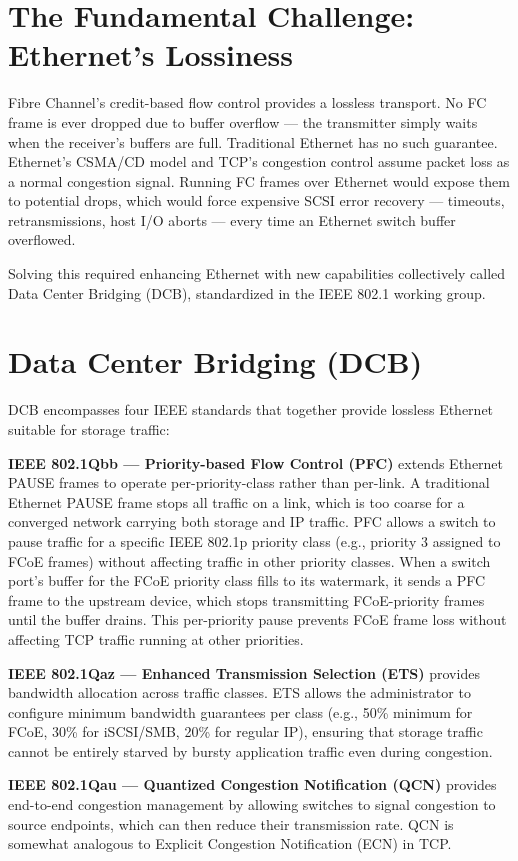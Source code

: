 \section{The Fundamental Challenge: Ethernet's Lossiness}
Fibre Channel's credit-based flow control provides a lossless transport. No FC frame is ever dropped due to buffer overflow --- the transmitter simply waits when the receiver's buffers are full. Traditional Ethernet has no such guarantee. Ethernet's CSMA/CD model and TCP's congestion control assume packet loss as a normal congestion signal. Running FC frames over Ethernet would expose them to potential drops, which would force expensive SCSI error recovery --- timeouts, retransmissions, host I/O aborts --- every time an Ethernet switch buffer overflowed.

Solving this required enhancing Ethernet with new capabilities collectively called Data Center Bridging (DCB), standardized in the IEEE 802.1 working group.

\section{Data Center Bridging (DCB)}
DCB encompasses four IEEE standards that together provide lossless Ethernet suitable for storage traffic:

\textbf{IEEE 802.1Qbb --- Priority-based Flow Control (PFC)} extends Ethernet PAUSE frames to operate per-priority-class rather than per-link. A traditional Ethernet PAUSE frame stops all traffic on a link, which is too coarse for a converged network carrying both storage and IP traffic. PFC allows a switch to pause traffic for a specific IEEE 802.1p priority class (e.g., priority 3 assigned to FCoE frames) without affecting traffic in other priority classes. When a switch port's buffer for the FCoE priority class fills to its watermark, it sends a PFC frame to the upstream device, which stops transmitting FCoE-priority frames until the buffer drains. This per-priority pause prevents FCoE frame loss without affecting TCP traffic running at other priorities.

\textbf{IEEE 802.1Qaz --- Enhanced Transmission Selection (ETS)} provides bandwidth allocation across traffic classes. ETS allows the administrator to configure minimum bandwidth guarantees per class (e.g., 50\% minimum for FCoE, 30\% for iSCSI/SMB, 20\% for regular IP), ensuring that storage traffic cannot be entirely starved by bursty application traffic even during congestion.

\textbf{IEEE 802.1Qau --- Quantized Congestion Notification (QCN)} provides end-to-end congestion management by allowing switches to signal congestion to source endpoints, which can then reduce their transmission rate. QCN is somewhat analogous to Explicit Congestion Notification (ECN) in TCP.

